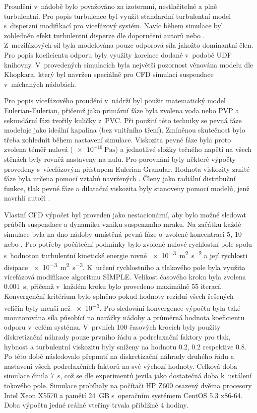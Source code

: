 Proudění v~nádobě bylo považováno za izotermní, nestlačitelné a plně turbulentní. Pro popis turbulence byl využit standardní \keps{} turbulentní model s~disperzní modifikací pro vícefázový systém. Navíc během simulace byl zohledněn efekt turbulentní disperze dle doporučení autorů \citet{lju01} nebo \citet{tamb09}. Z~mezifázových sil byla modelována pouze odporová síla jakožto dominantní člen. Pro popis koeficientu odporu byly využity korelace dodané v~podobě UDF knihovny. V~provedených simulacích byla největší pozornost věnována modelu dle Khopkara, který byl navržen speciálně pro CFD simulaci suspendace v~míchaných nádobách.

Pro popis vícefázového proudění v~nádrží byl použit 
matematický model Eulerian-Eulerian, přičemž jako primární fáze 
byla zvolena voda nebo PVP a sekundární fázi tvořily kuličky z~PVC. 
Při použití této techniky se pevná fáze modeluje jako ideální 
kapalina (bez vnitřního tření). Zmíněnou skutečnost bylo třeba 
zohlednit během nastavení simulace. Viskozita pevné fáze byla proto zvolena téměř nulová ($\SI{e-10}{\pascal\second}$) a jednotlivé složky tečného napětí na všech stěnách byly rovněž nastaveny na nulu. Pro porovnání byly některé výpočty provedeny s~vícefázovým přístupem Eulerian-Granular. Hodnota viskozity zrnité fáze byla určena pomocí vztahů navržených \citet{syam93}. Členy jako radiální distribuční funkce, tlak pevné fáze a dilatační viskozita byly stanoveny pomocí modelů, jenž navrhli autoři \citet{lun84}.  

Vlastní CFD výpočet byl proveden jako nestacionární, aby bylo možné sledovat průběh suspendace a dynamiku vzniku suspenzního mraku. Na začátku každé simulace byla na dno nádoby umístěná pevná fáze o~zvolené koncentraci 5, 10 nebo . Pro potřeby počáteční podmínky bylo zvolené nulové rychlostní pole spolu s~hodnotou turbulentní kinetické energie rovné \SI{e-3}{\meter\squared\per\second\squared} a její rychlosti disipace \SI{e-3}{\meter\squared\per\second\cubed}. K~určení rychlostního a tlakového pole byla využita vícefázová modifikace algoritmu SIMPLE. Velikost časového kroku byla zvolena \SI{0.001}{\second}, přičemž v~každém kroku bylo provedeno maximálně \num{55} iterací. Konvergenční kritérium bylo splněno pokud hodnoty reziduí všech řešených veličin byly menší než \num{e-3}. Pro sledování konvergence výpočtu byla také monitorována síla působící na narážky nádoby a průměrná hodnota koeficientu odporu v~celém systému. V~prvních \num{100} časových krocích byly použity diskretizační náhrady pouze prvního řádu a podrelaxační faktory pro tlak, hybnost a turbulentní viskozitu byly sníženy na hodnotu \num{0.2}, \num{0.2} respektive \num{0.8}. Po této době následovalo přepnutí na diskretizační náhrady druhého řádu a nastavení všech podrelaxčních faktorů na své výchozí hodnoty. Celková doba simulace činila \SI{7}{\second}, což se dle experimentů jevila jako dostatečná doba k~ustálení tokového pole. Simulace probíhaly na počítači HP Z600 osazený dvěma procesory Intel Xeon X5570 a pamětí 24~GB s~operačním systémem CentOS 5.3 x86-64. Doba výpočtu jedné reálné vteřiny trvala přibližně 4 hodiny.


